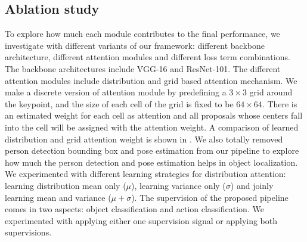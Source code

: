 \subsection{Ablation study}
To explore how much each module contributes to the final performance, we investigate with different variants of our framework: different backbone architecture, different attention modules and different loss term combinations. The backbone architectures include VGG-16 and ResNet-101. The different attention modules include distribution and grid based attention mechanism. We make a discrete version of attention module by predefining a $3\times 3$ grid around the keypoint, and the size of each cell of the grid is fixed to be $64\times 64$. There is an estimated weight for each cell as attention and all proposals whose centers fall into the cell will be assigned with the attention weight. A comparison of learned distribution and grid attention weight is shown in \figref{}. We also totally removed person detection bounding box and pose estimation from our pipeline to explore how much the person detection and pose estimation helps in object localization.
We experimented with different learning strategies for distribution attention: learning distribution mean only ($\mu$), learning variance only ($\sigma$) and joinly learning mean and variance ($\mu+\sigma$). The supervision of the proposed pipeline comes in two aspects: object classification and action classification. We experimented with applying either one supervision signal or applying both supervisions. 

